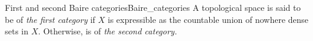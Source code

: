 \begin{definition}{First and second Baire categories}{Baire_categories}
    A topological space  is said to be of \emph{the first category} if \(X\) is expressible as the countable union of nowhere dense sets in \(X\). Otherwise,  is of \emph{the second category.}
\end{definition}

